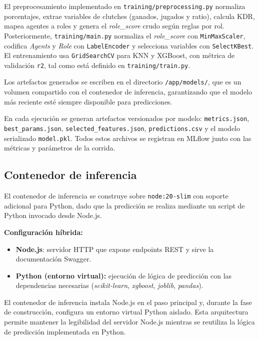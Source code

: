 \documentclass{ULBreport} %
\begin{document}
El preprocesamiento implementado en \texttt{training/preprocessing.py} normaliza porcentajes, extrae variables de clutches (ganados, jugados y ratio), calcula KDR, mapea agentes a roles y genera el \textit{role\_score} crudo según reglas por rol. Posteriormente, \texttt{training/main.py} normaliza el \textit{role\_score} con \texttt{MinMaxScaler}, codifica \textit{Agents} y \textit{Role} con \texttt{LabelEncoder} y selecciona variables con \texttt{SelectKBest}. El entrenamiento usa \texttt{GridSearchCV} para KNN y XGBoost, con métrica de validación \texttt{r2}, tal como está definido en \texttt{training/train.py}.

Los artefactos generados se escriben en el directorio \texttt{/app/models/}, que es un volumen compartido con el contenedor de inferencia, garantizando que el modelo más reciente esté siempre disponible para predicciones.

En cada ejecución se generan artefactos versionados por modelo: \texttt{metrics.json}, \texttt{best\_params.json}, \texttt{selected\_features.json}, \texttt{predictions.csv} y el modelo serializado \texttt{model.pkl}. Todos estos archivos se registran en MLflow junto con las métricas y parámetros de la corrida.

\subsection{Contenedor de inferencia}

El contenedor de inferencia se construye sobre \texttt{node:20-slim} con soporte adicional para Python, dado que la predicción se realiza mediante un script de Python invocado desde Node.js.

\textbf{Configuración híbrida:}
\begin{itemize}
    \item \textbf{Node.js}: servidor HTTP que expone endpoints REST y sirve la documentación Swagger.
    \item \textbf{Python (entorno virtual):} ejecución de lógica de predicción con las dependencias necesarias (\textit{scikit-learn}, \textit{xgboost}, \textit{joblib}, \textit{pandas}).
\end{itemize}

El contenedor de inferencia instala Node.js en el paso principal y, durante la fase de construcción, configura un entorno virtual Python aislado. Esta arquitectura permite mantener la legibilidad del servidor Node.js mientras se reutiliza la lógica de predicción implementada en Python.
\end{document}
